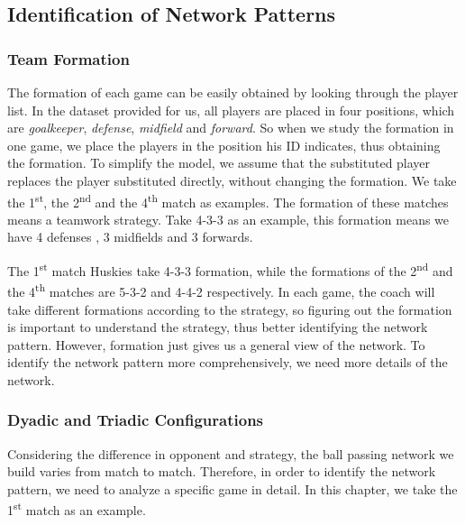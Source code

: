 \documentclass[12pt]{article}  %
\begin{document}
\subsection{Identification of Network Patterns}
\subsubsection{Team Formation}
The formation of each game can be easily obtained by looking through the player list. In the dataset provided for us, all players are placed in four positions, which are \textit{goalkeeper}, \textit{defense}, \textit{midfield} and \textit{forward}. So when we study the formation in one game, we place the players in the position his ID indicates, thus obtaining the formation. To simplify the model, we assume that the substituted player replaces the player substituted directly, without changing the formation. 
We take the 1\textsuperscript{st}, the 2\textsuperscript{nd} and the 4\textsuperscript{th} match as examples. 
The formation of these matches means a teamwork strategy. Take \textsf{4-3-3} as an example, this formation means we have 4 defenses , 3 midfields and 3 forwards.


The 1\textsuperscript{st} match Huskies take \textsf{4-3-3} formation, while the formations of the 2\textsuperscript{nd} and the 4\textsuperscript{th} matches are \textsf{5-3-2} and \textsf{4-4-2} respectively. In each game, the coach will take different formations according to the strategy, so figuring out the formation is important to understand the strategy, thus better identifying the network pattern. However, formation just gives us a general view of the network. To identify the network pattern more comprehensively, we need more details of the network. 

\subsubsection{Dyadic and Triadic Configurations}
Considering the difference in opponent and strategy, the ball passing network we build varies from match to match. Therefore, in order to identify the network pattern, we need to analyze a specific game in detail. In this chapter, we take the 1\textsuperscript{st} match as an example.
\end{document}
